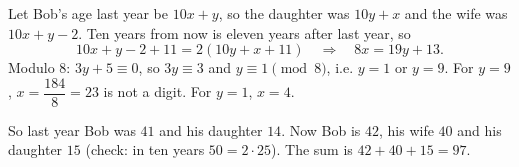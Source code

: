 Let Bob's age last year be $10x+y$, so the daughter was $10y+x$ and the wife was $10x+y-2$. Ten years from now is eleven years after last year, so
\[10x+y-2+11=2\left(10y+x+11\right)\quad\Longrightarrow\quad8x=19y+13.\]
Modulo $8$: $3y+5\equiv0$, so $3y\equiv3$ and $y\equiv1\pmod8$, i.e. $y=1$ or $y=9$. For $y=9$, $x=\dfrac{184}8=23$ is not a digit. For $y=1$, $x=4$.

So last year Bob was $41$ and his daughter $14$. Now Bob is $42$, his wife $40$ and his daughter $15$ (check: in ten years $50=2\cdot25$). The sum is $42+40+15=\boxed{97}$.
